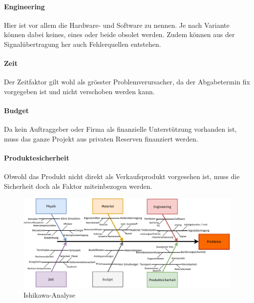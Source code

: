 \paragraph{Engineering} Hier ist vor allem die Hardware- und Software zu nennen. Je nach Variante können dabei keines, eines oder beide obsolet werden. Zudem können aus der Signalübertragung her auch Fehlerquellen entstehen.
\paragraph{Zeit} Der Zeitfaktor gilt wohl als grösster Problemverursacher, da der Abgabetermin fix vorgegeben ist und nicht verschoben werden kann.
\paragraph{Budget} Da kein Auftraggeber oder Firma als finanzielle Unterstützung vorhanden ist, muss das ganze Projekt aus privaten Reserven finanziert werden.
\paragraph{Produktesicherheit} Obwohl das Produkt nicht direkt als Verkaufsprodukt vorgesehen ist, muss die Sicherheit doch als Faktor miteinbezogen werden.
\vspace{6mm}
\begin{figure}[H]
	\centering
	\includegraphics[width=\textwidth]{pictures/ishikawa.pdf}
	\caption{Ishikawa-Analyse}
	\label{pics:ishikawa}
\end{figure}